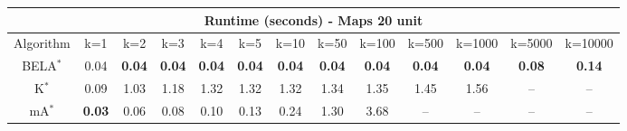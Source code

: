 \begin{tabular}{c|cccccccccccc}\toprule
\multicolumn{13}{c}{Runtime (seconds) - Maps 20 unit}\\ \midrule
Algorithm & k=1 & k=2 & k=3 & k=4 & k=5 & k=10 & k=50 & k=100 & k=500 & k=1000 & k=5000 & k=10000 \\ \midrule
BELA$^*$ & 0.04 & \textbf{0.04} & \textbf{0.04} & \textbf{0.04} & \textbf{0.04} & \textbf{0.04} & \textbf{0.04} & \textbf{0.04} & \textbf{0.04} & \textbf{0.04} & \textbf{0.08} & \textbf{0.14} \\
K$^*$ & 0.09 & 1.03 & 1.18 & 1.32 & 1.32 & 1.32 & 1.34 & 1.35 & 1.45 & 1.56 & -- & -- \\
mA$^*$ & \textbf{0.03} & 0.06 & 0.08 & 0.10 & 0.13 & 0.24 & 1.30 & 3.68 & -- & -- & -- & -- \\ \bottomrule 
\end{tabular}
